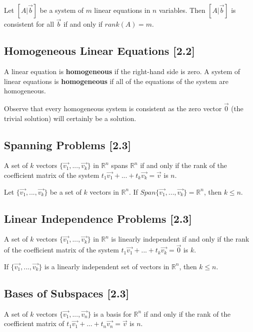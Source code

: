 \documentclass[a4paper,9pt]{extarticle}
\begin{document}
\begin{multicols*}{2}
Let $[A | \vec{b}]$ be a system of $m$ linear equations in $n$ variables. Then $[A | \vec{b}]$ is consistent for all $\vec{b}$ if and only if $rank(A) = m$.


\subsection{Homogeneous Linear Equations [2.2]}
A linear equation is \textbf{homogeneous} if the right-hand side is zero. A system of linear equations is \textbf{homogeneous} if all of the equations of the system are homogeneous.

Observe that every homogeneous system is consistent as the zero vector $\vec{0}$ (the trivial solution) will certainly be a solution.


\subsection{Spanning Problems [2.3]}
A set of $k$ vectors $\{\vec{v_1}, ... ,\vec{v_k}\}$ in $\mathbb{R}^n$ spans $\mathbb{R}^n$ if and only if the rank of the coefficient matrix of the system $t_1 \vec{v_1} + ... + t_k \vec{v_k} = \vec{v}$ is $n$.

Let $\{\vec{v_1}, ... ,\vec{v_k}\}$ be a set of $k$ vectors in $\mathbb{R}^n$. If $Span\{\vec{v_1}, ... ,\vec{v_k}\} = \mathbb{R}^n$, then $k \leq n$.


\subsection{Linear Independence Problems [2.3]}
A set of $k$ vectors $\{\vec{v_1}, ... ,\vec{v_k}\}$ in $\mathbb{R}^n$ is linearly independent if and only if the rank of the coefficient matrix of the system $t_1 \vec{v_1} + ... + t_k \vec{v_k} = \vec{0}$ is $k$.

If $\{\vec{v_1}, ... ,\vec{v_k}\}$ is a linearly independent set of vectors in $\mathbb{R}^n$, then $k \leq n$.


\subsection{Bases of Subspaces [2.3]}
A set of $k$ vectors $\{\vec{v_1}, ... ,\vec{v_n}\}$ is a basis for $\mathbb{R}^n$ if and only if the rank of the coefficient matrix of $t_1 \vec{v_1} + ... + t_n \vec{v_n} = \vec{v}$ is $n$.


\end{multicols*}
\end{document}
